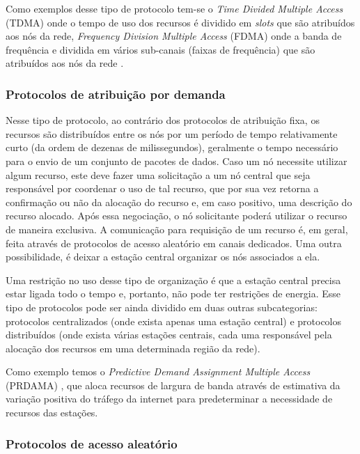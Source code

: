  Como exemplos desse tipo de protocolo tem-se o \textit{Time Divided Multiple Access} (TDMA) \cite{Kulkarni2004} onde o tempo de uso dos recursos é dividido em \textit{slots} que são atribuídos aos nós da rede, \textit{Frequency Division Multiple Access} (FDMA) onde a banda de frequência e dividida em vários sub-canais (faixas de frequência) que são atribuídos aos nós da rede \cite{Arms_frequencyagile}.
	
 \subsubsection{Protocolos de atribuição por demanda} 
 
 Nesse tipo de protocolo, ao contrário dos protocolos de atribuição fixa, os recursos são distribuídos entre os nós por um período de tempo relativamente curto (da ordem de dezenas de milissegundos), geralmente o tempo necessário para o envio de um conjunto de pacotes de dados. Caso um nó necessite utilizar algum recurso, este deve fazer uma solicitação a um nó central que seja responsável por coordenar o uso de tal recurso, que por sua vez retorna a confirmação ou não da alocação do recurso e, em caso positivo, uma descrição do recurso alocado. Após essa negociação, o nó solicitante poderá utilizar o recurso de maneira exclusiva. A comunicação para requisição de um recurso é, em geral, feita através de protocolos de acesso aleatório em canais dedicados. Uma outra possibilidade, é deixar a estação central organizar os nós associados a ela. 
 
 Uma restrição no uso desse tipo de organização é que a estação central precisa estar ligada todo o tempo e, portanto, não pode ter restrições de energia. Esse tipo de protocolos pode ser ainda dividido em duas outras subcategorias: protocolos centralizados (onde exista apenas uma estação central) e protocolos distribuídos (onde exista várias estações centrais, cada uma responsável pela alocação dos recursos em uma determinada região da rede). 
 
 Como exemplo temos o \textit{Predictive Demand Assignment Multiple Access} (PRDAMA) \cite{Jiang_apredictive}, que aloca recursos de largura de banda através de estimativa da variação positiva do tráfego da internet para predeterminar a necessidade de recursos das estações.

 \subsubsection{Protocolos de acesso aleatório}	

